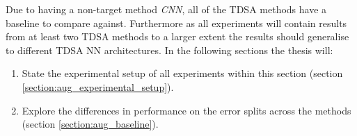 Due to having a non-target method \textit{CNN}, all of the TDSA methods have a baseline to compare against. Furthermore as all experiments will contain results from at least two TDSA methods to a larger extent the results should generalise to different TDSA NN architectures. In the following sections the thesis will:
\begin{enumerate}
    \item State the experimental setup of all experiments within this section (section \ref{section:aug_experimental_setup}).
    \item Explore the differences in performance on the error splits across the methods (section \ref{section:aug_baseline}).
\end{enumerate}

\FloatBarrier
